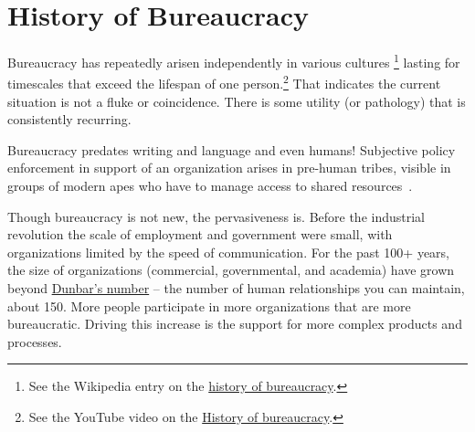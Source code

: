 \section{History of Bureaucracy\label{sec:history}}


Bureaucracy has repeatedly arisen independently in various cultures
\footnote{See the Wikipedia entry on the \href{https://en.wikipedia.org/wiki/Bureaucracy\%23History}{history of bureaucracy}.
}
lasting for timescales that exceed the lifespan of one person.\footnote{See the YouTube video on the \href{https://www.youtube.com/watch?v=B_nsZlcC12g}{History of bureaucracy}.} That indicates the current situation is not a fluke or coincidence. There is some utility (or pathology) that is consistently recurring. 


Bureaucracy predates writing and language and even humans! Subjective policy enforcement in support of an organization arises in pre-human tribes, visible in groups of modern apes who have to manage access to shared resources~\cite{2016_Suchak}. 



Though bureaucracy is not new, the pervasiveness is. Before the industrial revolution the scale of employment and government were small, with organizations limited by the speed of communication. For the past 100+ years, the size of organizations (commercial, governmental, and academia) have grown beyond \href{https://en.wikipedia.org/wiki/Dunbar\%27s_number}{Dunbar's number} -- the number of human relationships you can maintain, about 150. \iftoggle{WPinmargin}{\marginpar{[Wikipedia] Dunbar's\\number}}{}
More people participate in more organizations that are more bureaucratic. Driving this increase is the support for more complex products and processes. 



